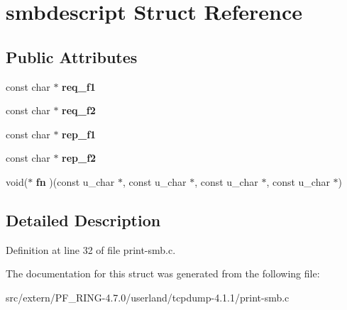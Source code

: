 \hypertarget{structsmbdescript}{
\section{smbdescript Struct Reference}
\label{structsmbdescript}
}
\subsection*{Public Attributes}
\begin{DoxyCompactItemize}
\item 
\hypertarget{structsmbdescript_aa14a221793cdbdd59b82ff1039a02808}{
const char $\ast$ {\bfseries req\_\-f1}}
\label{structsmbdescript_aa14a221793cdbdd59b82ff1039a02808}

\item 
\hypertarget{structsmbdescript_adfd5c9fea78997fa0bf8dab047d37dae}{
const char $\ast$ {\bfseries req\_\-f2}}
\label{structsmbdescript_adfd5c9fea78997fa0bf8dab047d37dae}

\item 
\hypertarget{structsmbdescript_a7e968f1059302c714948545a5d111785}{
const char $\ast$ {\bfseries rep\_\-f1}}
\label{structsmbdescript_a7e968f1059302c714948545a5d111785}

\item 
\hypertarget{structsmbdescript_a9005109bfd6db20760b9be98a9efdf01}{
const char $\ast$ {\bfseries rep\_\-f2}}
\label{structsmbdescript_a9005109bfd6db20760b9be98a9efdf01}

\item 
\hypertarget{structsmbdescript_a3b58bae928474dceec1e077002b30b16}{
void($\ast$ {\bfseries fn} )(const u\_\-char $\ast$, const u\_\-char $\ast$, const u\_\-char $\ast$, const u\_\-char $\ast$)}
\label{structsmbdescript_a3b58bae928474dceec1e077002b30b16}

\end{DoxyCompactItemize}


\subsection{Detailed Description}


Definition at line 32 of file print-\/smb.c.



The documentation for this struct was generated from the following file:\begin{DoxyCompactItemize}
\item 
src/extern/PF\_\-RING-\/4.7.0/userland/tcpdump-\/4.1.1/print-\/smb.c\end{DoxyCompactItemize}
